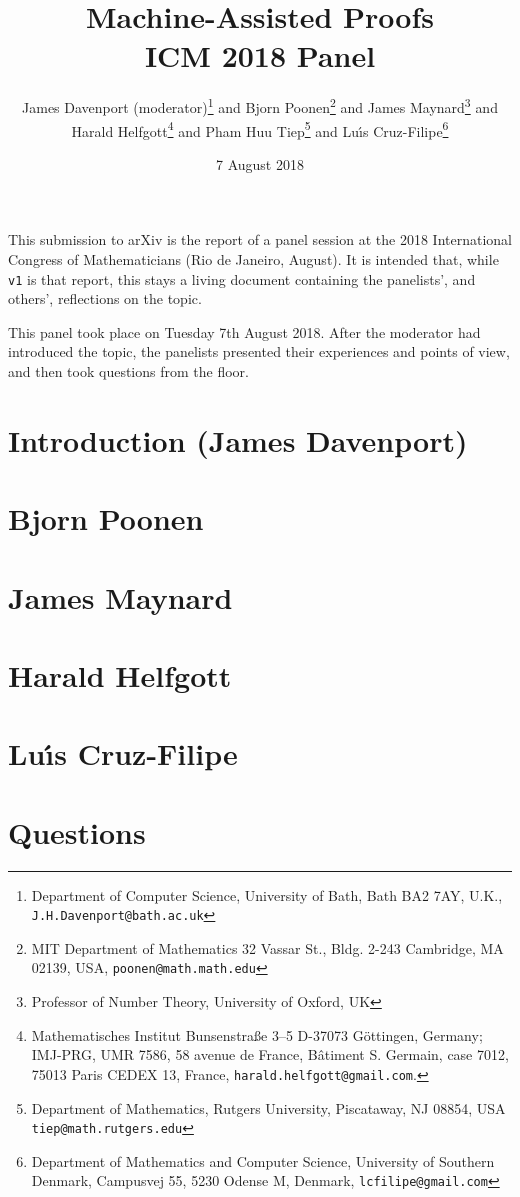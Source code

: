 \documentclass{article}
\begin{document}
\title{Machine-Assisted Proofs\\ICM 2018 Panel}
\author{James Davenport (moderator)\footnote{Department of Computer Science, University of Bath, Bath BA2 7AY, U.K., {\tt J.H.Davenport@bath.ac.uk}}{ } and Bjorn Poonen\footnote{MIT Department of Mathematics
32 Vassar St., Bldg. 2-243
Cambridge, MA 02139, USA, {\tt poonen@math.math.edu}}{ } and James Maynard\footnote{Professor of Number Theory, University of Oxford, UK}{ } and \\Harald Helfgott\footnote{Mathematisches Institut
Bunsenstra{\ss}e 3--5
D-37073 G\"ottingen, Germany;   IMJ-PRG, UMR 7586,
  58 avenue de France, B\^{a}timent S. Germain, case 7012,
  75013 Paris CEDEX 13, France, {\tt harald.helfgott@gmail.com}.}{ } and Pham Huu Tiep\footnote{Department of Mathematics,  Rutgers University, Piscataway, NJ 08854, USA %
{\tt tiep@math.rutgers.edu}}{ } and Lu\'\i{}s Cruz-Filipe\footnote{Department of Mathematics and Computer Science, University of Southern Denmark, Campusvej 55,
5230 Odense M,
Denmark, {\tt lcfilipe@gmail.com}}}
\date{7 August 2018}
\maketitle\noindent
This submission to arXiv is the report of a panel session at the 2018 International Congress of Mathematicians (Rio de Janeiro, August).  It is intended that, while \verb+v1+ is that report, this stays a living document containing the panelists', and others', reflections on the topic.
\par
This panel took place on Tuesday 7th August 2018. After the moderator had introduced the topic, the panelists presented their experiences and points of view, and then took questions from the floor.
\section{Introduction (James Davenport)}

\section{Bjorn Poonen}

\section{James Maynard}

\section{Harald Helfgott}


\section{Lu\'\i{}s Cruz-Filipe}

\section{Questions}


\end{document}
